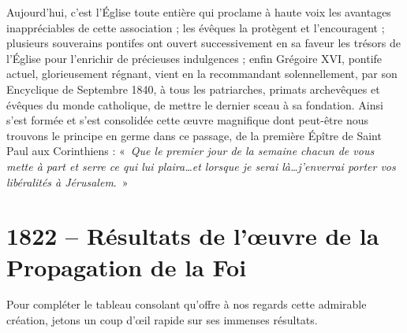 \documentclass[11pt,a4paper]{report}
\begin{document}
Aujourd'hui, c'est l'Église toute entière qui proclame à haute voix les avantages inappréciables de cette association ; les évêques la protègent et l'encouragent ; plusieurs souverains pontifes ont ouvert successivement en sa faveur les trésors de l'Église pour l'enrichir de précieuses indulgences ; enfin Grégoire XVI, pontife actuel, glorieusement régnant, vient en la recommandant solennellement, par son Encyclique de Septembre 1840, à tous les patriarches, primats archevêques et évêques du monde catholique, de mettre le dernier sceau à sa fondation. Ainsi s'est formée et s'est consolidée cette œuvre magnifique dont peut-être nous trouvons le principe en germe dans ce passage, de la première Épître de Saint Paul aux Corinthiens : «~\textit{Que le premier jour de la semaine chacun de vous mette à part et serre ce qui lui plaira\dots et lorsque je serai là\dots j'enverrai porter vos libéralités à Jérusalem}.~»

\section*{1822 -- Résultats de l'œuvre de la Propagation de la Foi}

Pour compléter le tableau consolant qu'offre à nos regards cette admirable création, jetons un coup d'œil rapide sur ses immenses résultats.
\end{document}
